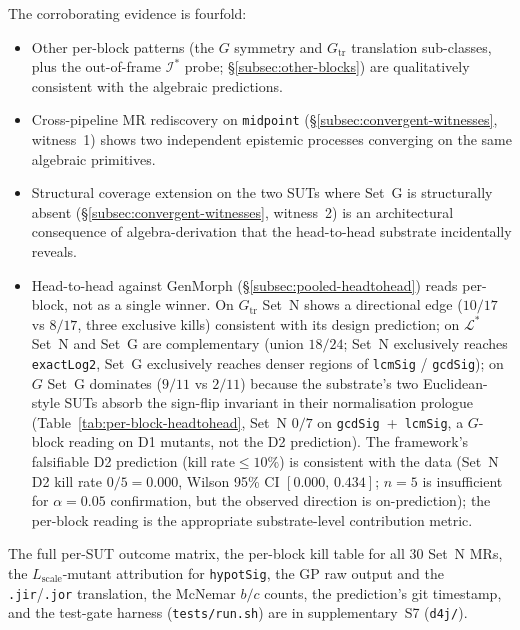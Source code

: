 \documentclass[manuscript]{acmart}
\begin{document}
The corroborating evidence is fourfold:
\begin{itemize}[nosep,leftmargin=*]
  \item Other per-block patterns (the $G$ symmetry and $G_{\mathrm{tr}}$ translation sub-classes, plus the out-of-frame $\mathcal{I}^{*}$ probe;
        \S\ref{subsec:other-blocks}) are qualitatively consistent
        with the algebraic predictions.
  \item Cross-pipeline MR rediscovery on \texttt{midpoint}
        (\S\ref{subsec:convergent-witnesses}, witness~1) shows two
        independent epistemic processes converging on the same
        algebraic primitives.
  \item Structural coverage extension on the two SUTs where Set~G
        is structurally absent (\S\ref{subsec:convergent-witnesses},
        witness~2) is an architectural consequence of
        algebra-derivation that the head-to-head substrate
        incidentally reveals.
  \item Head-to-head against GenMorph
        (\S\ref{subsec:pooled-headtohead}) reads per-block, not as a
        single winner. On $G_{\mathrm{tr}}$ Set~N shows a directional
        edge ($10/17$ vs $8/17$, three exclusive kills) consistent with
        its design prediction; on $\mathcal{L}^{*}$ Set~N and Set~G
        are complementary (union $18/24$; Set~N exclusively reaches
        \texttt{exactLog2}, Set~G exclusively reaches denser regions
        of \texttt{lcmSig} / \texttt{gcdSig}); on $G$ Set~G dominates
        ($9/11$ vs $2/11$) because the substrate's two Euclidean-
        style SUTs absorb the sign-flip invariant in their
        normalisation prologue (Table~\ref{tab:per-block-headtohead},
        Set~N $0/7$ on \texttt{gcdSig}~+~\texttt{lcmSig}, a $G$-block
        reading on D1 mutants, not the D2 prediction). The
        framework's falsifiable D2 prediction
        ($\mathrm{kill\;rate} \le 10\%$) is consistent with the data
        (Set~N D2 kill rate $0/5 = 0.000$, Wilson 95\% CI
        $[0.000,\,0.434]$; $n = 5$ is insufficient for $\alpha = 0.05$
        confirmation, but the observed direction is on-prediction);
        the per-block reading is the appropriate substrate-level
        contribution metric.
\end{itemize}

The full per-SUT outcome matrix, the per-block kill table for all 30
Set~N MRs, the $L_{\mathrm{scale}}$-mutant attribution for
\texttt{hypotSig}, the GP raw output and the
\texttt{.jir}/\texttt{.jor} translation, the McNemar $b/c$ counts,
the prediction's git timestamp, and the test-gate harness
(\texttt{tests/run.sh}) are in supplementary~S7 (\texttt{d4j/}).
\end{document}
